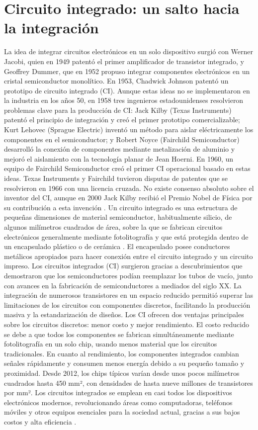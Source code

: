 \documentclass[]{article}
\begin{document}
\section{Circuito integrado: un salto hacia la integración}
La idea de integrar circuitos electrónicos en un solo dispositivo surgió con Werner Jacobi, quien en 1949 patentó el primer amplificador de transistor integrado, y Geoffrey Dummer, que en 1952 propuso integrar componentes electrónicos en un cristal semiconductor monolítico. En 1953, Chadwick Johnson patentó un prototipo de circuito integrado (CI).
Aunque estas ideas no se implementaron en la industria en los años 50, en 1958 tres ingenieros estadounidenses resolvieron problemas clave para la producción de CI: Jack Kilby (Texas Instruments) patentó el principio de integración y creó el primer prototipo comercializable; Kurt Lehovec (Sprague Electric) inventó un método para aislar eléctricamente los componentes en el semiconductor; y Robert Noyce (Fairchild Semiconductor) desarrolló la conexión de componentes mediante metalización de aluminio y mejoró el aislamiento con la tecnología planar de Jean Hoerni.
En 1960, un equipo de Fairchild Semiconductor creó el primer CI operacional basado en estas ideas. Texas Instruments y Fairchild tuvieron disputas de patentes que se resolvieron en 1966 con una licencia cruzada. No existe consenso absoluto sobre el inventor del CI, aunque en 2000 Jack Kilby recibió el Premio Nobel de Física por su contribución a esta invención \cite{nobel2000}.
Un circuito integrado es una estructura de pequeñas dimensiones de material semiconductor, habitualmente silicio, de algunos milímetros cuadrados de área, sobre la que se fabrican circuitos electrónicos generalmente mediante fotolitografía y que está protegida dentro de un encapsulado plástico o de cerámica \cite{fitchen1975}. El encapsulado posee conductores metálicos apropiados para hacer conexión entre el circuito integrado y un circuito impreso.
Los circuitos integrados (CI) surgieron gracias a descubrimientos que demostraron que los semiconductores podían reemplazar los tubos de vacío, junto con avances en la fabricación de semiconductores a mediados del siglo XX. La integración de numerosos transistores en un espacio reducido permitió superar las limitaciones de los circuitos con componentes discretos, facilitando la producción masiva y la estandarización de diseños.
Los CI ofrecen dos ventajas principales sobre los circuitos discretos: menor costo y mejor rendimiento. El costo reducido se debe a que todos los componentes se fabrican simultáneamente mediante fotolitografía en un solo chip, usando menos material que los circuitos tradicionales. En cuanto al rendimiento, los componentes integrados cambian señales rápidamente y consumen menos energía debido a su pequeño tamaño y proximidad.
Desde 2012, los chips típicos varían desde unos pocos milímetros cuadrados hasta 450 mm², con densidades de hasta nueve millones de transistores por mm². Los circuitos integrados se emplean en casi todos los dispositivos electrónicos modernos, revolucionando áreas como computadoras, teléfonos móviles y otros equipos esenciales para la sociedad actual, gracias a sus bajos costos y alta eficiencia \cite{fitchen1975}.
\end{document}
